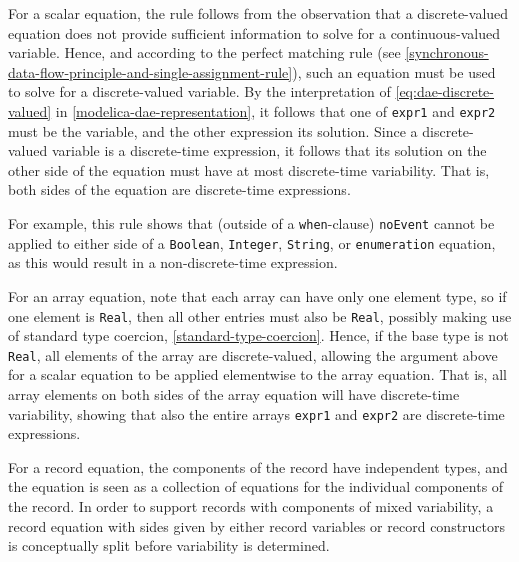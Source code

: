 \begin{nonnormative}
For a scalar equation, the rule follows from the observation that a discrete-valued equation does not provide sufficient information to solve for a continuous-valued variable.
Hence, and according to the perfect matching rule (see \cref{synchronous-data-flow-principle-and-single-assignment-rule}), such an equation must be used to solve for a discrete-valued variable.
By the interpretation of \eqref{eq:dae-discrete-valued} in \cref{modelica-dae-representation}, it follows that one of \lstinline!expr1! and \lstinline!expr2! must be the variable, and the other expression its solution.
Since a discrete-valued variable is a discrete-time expression, it follows that its solution on the other side of the equation must have at most discrete-time variability.
That is, both sides of the equation are discrete-time expressions.

For example, this rule shows that (outside of a \lstinline!when!-clause) \lstinline!noEvent! cannot be applied to either side of a \lstinline!Boolean!, \lstinline!Integer!, \lstinline!String!, or \lstinline!enumeration! equation, as this would result in a non-discrete-time expression.

For an array equation, note that each array can have only one element type, so if one element is \lstinline!Real!, then all other entries must also be \lstinline!Real!, possibly making use of standard type coercion, \cref{standard-type-coercion}.
Hence, if the base type is not \lstinline!Real!, all elements of the array are discrete-valued, allowing the argument above for a scalar equation to be applied elementwise to the array equation.
That is, all array elements on both sides of the array equation will have discrete-time variability, showing that also the entire arrays \lstinline!expr1! and \lstinline!expr2! are discrete-time expressions.

For a record equation, the components of the record have independent types, and the equation is seen as a collection of equations for the individual components of the record.
In order to support records with components of mixed variability, a record equation with sides given by either record variables or record constructors is conceptually split before variability is determined.
\end{nonnormative}

